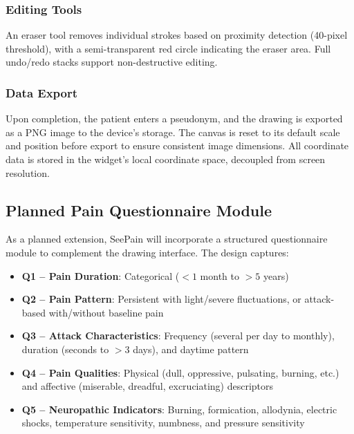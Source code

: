 \documentclass[conference]{IEEEtran}
\begin{document}
\subsubsection{Editing Tools}
An eraser tool removes individual strokes based on proximity detection (40-pixel threshold), with a semi-transparent red circle indicating the eraser area. Full undo/redo stacks support non-destructive editing.

\subsubsection{Data Export}
Upon completion, the patient enters a pseudonym, and the drawing is exported as a PNG image to the device's storage. The canvas is reset to its default scale and position before export to ensure consistent image dimensions. All coordinate data is stored in the widget's local coordinate space, decoupled from screen resolution.


\subsection{Planned Pain Questionnaire Module}

As a planned extension, SeePain will incorporate a structured questionnaire module to complement the drawing interface. The design captures:

\begin{itemize}
    \item \textbf{Q1 -- Pain Duration}: Categorical (${<}1$ month to ${>}5$ years)
    \item \textbf{Q2 -- Pain Pattern}: Persistent with light/severe fluctuations, or attack-based with/without baseline pain
    \item \textbf{Q3 -- Attack Characteristics}: Frequency (several per day to monthly), duration (seconds to ${>}3$ days), and daytime pattern
    \item \textbf{Q4 -- Pain Qualities}: Physical (dull, oppressive, pulsating, burning, etc.) and affective (miserable, dreadful, excruciating) descriptors
    \item \textbf{Q5 -- Neuropathic Indicators}: Burning, formication, allodynia, electric shocks, temperature sensitivity, numbness, and pressure sensitivity
\end{itemize}
\end{document}
